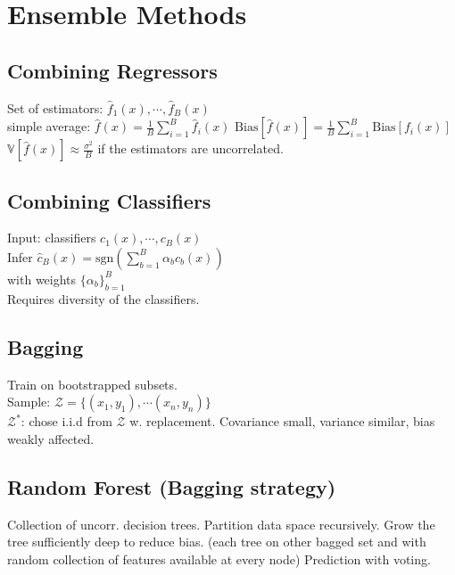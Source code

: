 \section*{Ensemble Methods}
\subsection*{Combining Regressors}
Set of estimators: $\hat{f}_1(x), \cdots, \hat{f}_B(x)$\\
simple average: $\hat{f}(x) = \frac{1}{B}\sum_{i=1}^B\hat{f}_i(x)$
$\mathrm{Bias}[\hat{f}(x)]=\frac{1}{B}\sum_{i=1}^B\mathrm{Bias}[f_i(x)]$\\
$\mathbb{V}[\hat{f}(x)]\approx\frac{\sigma^2}{B}$ if the estimators are uncorrelated.

\subsection*{Combining Classifiers}
Input: classifiers $c_1(x),\cdots,c_B(x)$\\
Infer $\hat{c}_B(x){=}\text{sgn}(\sum_{b=1}^B\alpha_b c_b(x))$\\
with weights $\{\alpha_b\}_{b=1}^B $\\
Requires diversity of the classifiers.

\subsection*{Bagging}
Train on bootstrapped subsets.\\
Sample: $\mathcal{Z}=\{(x_1,y_1),\cdots(x_n,y_n)\}$\\
$\mathcal{Z}^*$: chose i.i.d from $\mathcal{Z}$ w. replacement. Covariance small, variance similar, bias weakly affected.

 \subsection*{Random Forest (Bagging strategy)}
 Collection of uncorr. decision trees.
 Partition data space recursively. Grow the tree sufficiently deep to reduce bias. (each tree on other bagged set and with random collection of features available at every node)
 Prediction with voting.

